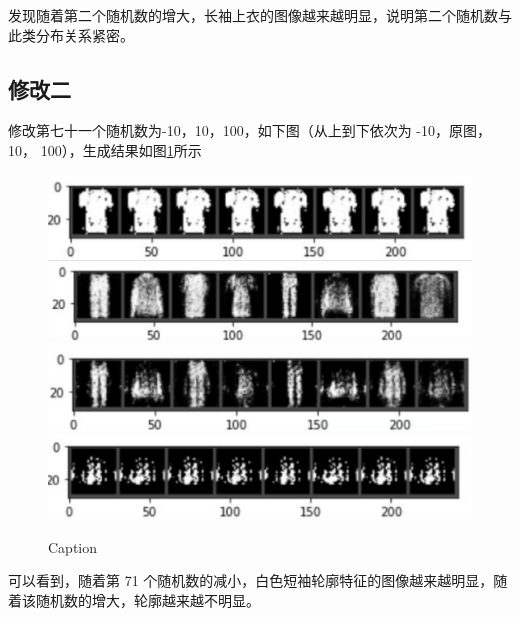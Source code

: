 \documentclass[UTF8,a4paper,10pt]{ctexart}
\begin{document}
发现随着第二个随机数的增大，长袖上衣的图像越来越明显，说明第二个随机数与
此类分布关系紧密。




\subsection{修改二}

修改第七十一个随机数为-10，10，100，如下图（从上到下依次为 -10，原图，10，
100），生成结果如图\ref{fig:1}所示
\begin{figure}[H]
    \centering
    \includegraphics[scale=0.5]{8.png}
    \includegraphics[scale=0.5]{9.png}
    \includegraphics[scale=0.5]{10.png}
    \includegraphics[scale=0.5]{11.png}
    \caption{Caption}
    \label{fig:1}
\end{figure}

可以看到，随着第 71 个随机数的减小，白色短袖轮廓特征的图像越来越明显，随
着该随机数的增大，轮廓越来越不明显。
\end{document}
